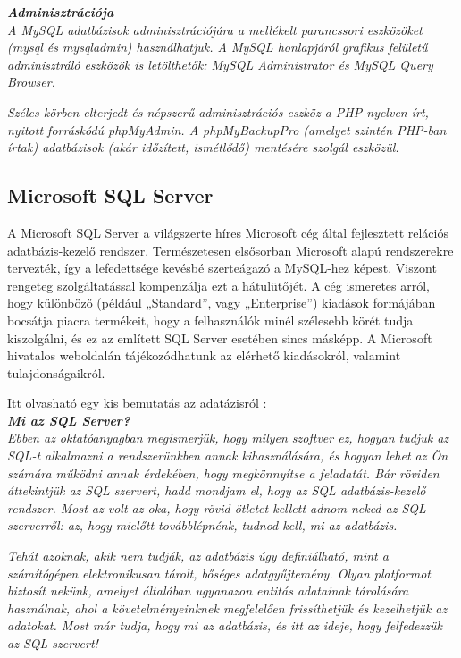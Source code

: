 \noindent\textit{\textbf{Adminisztrációja}}\\

\textit{A MySQL adatbázisok adminisztrációjára a mellékelt parancssori eszközöket (mysql és mysqladmin) használhatjuk. A MySQL honlapjáról grafikus felületű adminisztráló eszközök is letölthetők: MySQL Administrator és MySQL Query Browser.}

\textit{Széles körben elterjedt és népszerű adminisztrációs eszköz a PHP nyelven írt, nyitott forráskódú phpMyAdmin. A phpMyBackupPro (amelyet szintén PHP-ban írtak) adatbázisok (akár időzített, ismétlődő) mentésére szolgál eszközül.}


\subsection{Microsoft SQL Server}

A Microsoft SQL Server a világszerte híres Microsoft cég által fejlesztett relációs adatbázis-kezelő rendszer.
Természetesen elsősorban Microsoft alapú rendszerekre tervezték, így a lefedettsége kevésbé szerteágazó a MySQL-hez képest. Viszont rengeteg szolgáltatással kompenzálja ezt a hátulütőjét.
A cég ismeretes arról, hogy különböző (például „Standard”, vagy „Enterprise”) kiadások formájában bocsátja piacra termékeit, hogy a felhasználók minél szélesebb körét tudja kiszolgálni, és ez az említett SQL Server esetében sincs másképp. A Microsoft hivatalos weboldalán tájékozódhatunk az elérhető kiadásokról, valamint tulajdonságaikról.

Itt olvasható egy kis bemutatás az adatázisról \cite{mssqlcikk}:\\

\noindent\textit{\textbf{\large{Mi az SQL Server?}}}\\

\textit{Ebben az oktatóanyagban megismerjük, hogy milyen szoftver ez, hogyan tudjuk az SQL-t alkalmazni a rendszerünkben annak kihasználására, és hogyan lehet az Ön számára működni annak érdekében, hogy megkönnyítse a feladatát. Bár röviden áttekintjük az SQL szervert, hadd mondjam el, hogy az SQL adatbázis-kezelő rendszer. Most az volt az oka, hogy rövid ötletet kellett adnom neked az SQL szerverről: az, hogy mielőtt továbblépnénk, tudnod kell, mi az adatbázis.}

\textit{Tehát azoknak, akik nem tudják, az adatbázis úgy definiálható, mint a számítógépen elektronikusan tárolt, bőséges adatgyűjtemény. Olyan platformot biztosít nekünk, amelyet általában ugyanazon entitás adatainak tárolására használnak, ahol a követelményeinknek megfelelően frissíthetjük és kezelhetjük az adatokat. Most már tudja, hogy mi az adatbázis, és itt az ideje, hogy felfedezzük az SQL szervert!}\\

